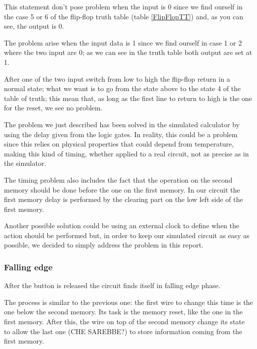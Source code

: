 \documentclass{article}
\begin{document}
\vspace{1mm}
This statement don't pose problem when the input is 0 since we find ourself in the case 5 or 6 of the flip-flop truth table (table \ref{FlipFlopTT}) and, as you can see, the output is 0. 

The problem arise when the input data is 1 since we find ourself in case 1 or 2 where the two input are 0; as we can see in the truth table both output are set at 1.

After one of the two input switch from low to high the flip-flop return in a normal state; what we want is to go from the state above to the state 4 of the table of truth; this mean that, as long as the first line to return to high is the one for the reset, we see no problem.

\vspace{3mm}

The problem we just described has been solved in the simulated calculator by using the delay given from the logic gates. In reality, this could be a problem since this relies on physical properties that could depend from temperature, making this kind of timing, whether applied to a real circuit, not as precise as in the simulator.

\vspace{1mm}

The timing problem also includes the fact that the operation on the second memory should be done before the one on the first memory. In our circuit the first memory delay is performed by the clearing part on the low left side of the first memory. %

\vspace{1mm}

Another possible solution could be using an external clock to define when the action should be performed but, in order to keep our simulated circuit as easy as possible, we decided to simply address the problem in this report.




\subsubsection{Falling edge}

After the button is released the circuit finds itself in falling edge phase.

\vspace{3mm}

The process is similar to the previous one: the first wire to change this time is the one below the second memory. Its task is the memory reset, like the one in the first memory. After this, the wire on top of the second memory change its state to allow the last one (CHE SAREBBE?) to store information coming from the first memory.
\end{document}
